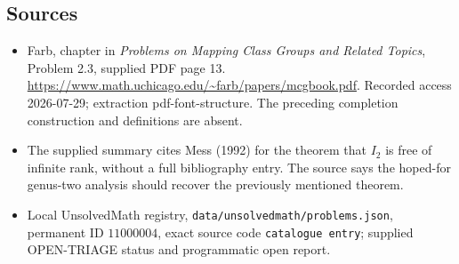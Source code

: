 \documentclass[11pt]{article}
\begin{document}
\subsection{Sources}
\begin{itemize}
\item Farb, chapter in \emph{Problems on Mapping Class Groups and Related Topics}, Problem 2.3, supplied PDF page 13. \url{https://www.math.uchicago.edu/~farb/papers/mcgbook.pdf}. Recorded access 2026-07-29; extraction pdf-font-structure. The preceding completion construction and definitions are absent.
\item The supplied summary cites Mess (1992) for the theorem that \(I_2\) is free of infinite rank, without a full bibliography entry. The source says the hoped-for genus-two analysis should recover the previously mentioned theorem.
\item Local UnsolvedMath registry, \texttt{data/unsolvedmath/problems.json}, permanent ID \(11000004\), exact source code \texttt{catalogue entry}; supplied OPEN-TRIAGE status and programmatic open report.
\end{itemize}
\end{document}
